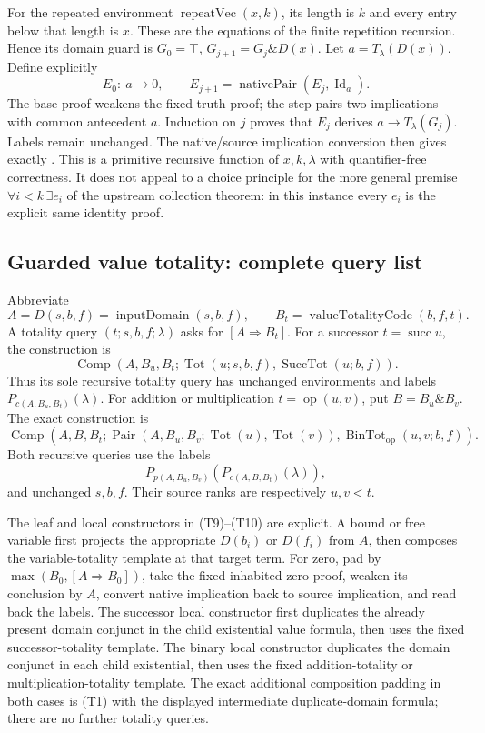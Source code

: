 For the repeated environment $\operatorname{repeatVec}(x,k)$, its
length is $k$ and every entry below that length is $x$.  These are
the equations of the finite repetition recursion.  Hence its domain
guard is $G_0=\top$, $G_{j+1}=G_j\mathbin{\&}D(x)$.
Let $a=T_\lambda(D(x))$.  Define explicitly
\[
 E_0:\ a\to0,\qquad
 E_{j+1}=\operatorname{nativePair}(E_j,\operatorname{Id}_a).
 \tag{T8}
\]
The base proof weakens the fixed truth proof; the step pairs two
implications with common antecedent $a$.  Induction on $j$ proves
that $E_j$ derives $a\to T_\lambda(G_j)$.  Labels remain unchanged.
The native/source implication conversion then gives exactly
.
This is a primitive recursive function of $x,k,\lambda$ with
quantifier-free correctness.  It does not appeal to a choice principle
for the more general premise $\forall i<k\,\exists e_i$ of the
upstream collection theorem: in this instance every $e_i$ is the
explicit same identity proof.

\subsection{Guarded value totality: complete query list}

Abbreviate
\[
 A=D(s,b,f)=\operatorname{inputDomain}(s,b,f),\qquad
 B_t=\operatorname{valueTotalityCode}(b,f,t).
\]
A totality query $(t;s,b,f;\lambda)$ asks for $[A\Rightarrow B_t]$.
For a successor $t=\operatorname{succ}u$, the construction is
\[
 \operatorname{Comp}(A,B_u,B_t;
          \operatorname{Tot}(u;s,b,f),\operatorname{SuccTot}(u;b,f)).
 \tag{T9}
\]
Thus its sole recursive totality query has unchanged environments and
labels $P_{c(A,B_u,B_t)}(\lambda)$.  For addition or multiplication
$t=\operatorname{op}(u,v)$, put $B=B_u\mathbin{\&}B_v$.  The exact
construction is
\[
 \operatorname{Comp}(A,B,B_t;
    \operatorname{Pair}(A,B_u,B_v;
                     \operatorname{Tot}(u),\operatorname{Tot}(v)),
    \operatorname{BinTot}_{\operatorname{op}}(u,v;b,f)).          \tag{T10}
\]
Both recursive queries use the labels
\[
 P_{p(A,B_u,B_v)}(P_{c(A,B,B_t)}(\lambda)),
\]
and unchanged $s,b,f$.  Their source ranks are respectively $u,v<t$.

The leaf and local constructors in (T9)--(T10) are explicit.  A bound
or free variable first projects the appropriate $D(b_i)$ or $D(f_i)$
from $A$, then composes the variable-totality template at that target
term.  For zero, pad by
$\max(B_0,[A\Rightarrow B_0])$, take the fixed inhabited-zero proof,
weaken its conclusion by $A$, convert native implication back to source
implication, and read back the labels.  The successor local constructor
first duplicates the already present domain conjunct in the child
existential value formula, then uses the fixed successor-totality
template.  The binary local constructor duplicates the domain conjunct
in each child existential, then uses the fixed addition-totality or
multiplication-totality template.  The exact additional composition
padding in both cases is (T1) with the displayed intermediate
duplicate-domain formula; there are no further totality queries.

